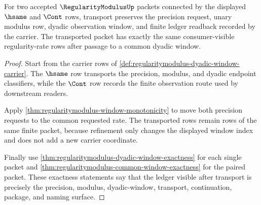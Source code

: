 \begin{theorem}
\label{thm:regularitymodulus-transport-ledger-obligations}
For two accepted $\RegularityModulusUp$ packets connected by the displayed
$\hsame$ and $\Cont$ rows, transport preserves the precision request, unary
modulus row, dyadic observation window, and finite ledger readback recorded by
the carrier. The transported packet has exactly the same consumer-visible
regularity-rate rows after passage to a common dyadic window.
\end{theorem}
\begin{proof}
Start from the carrier rows of
\autoref{def:regularitymodulus-dyadic-window-carrier}. The $\hsame$ row
transports the precision, modulus, and dyadic endpoint classifiers, while the
$\Cont$ row records the finite observation route used by downstream readers.

Apply \autoref{thm:regularitymodulus-window-monotonicity} to move both
precision requests to the common requested rate. The transported rows remain
rows of the same finite packet, because refinement only changes the displayed
window index and does not add a new carrier coordinate.

Finally use \autoref{thm:regularitymodulus-dyadic-window-exactness} for each
single packet and \autoref{thm:regularitymodulus-common-window-exactness} for
the paired packet. These exactness statements say that the ledger visible
after transport is precisely the precision, modulus, dyadic-window,
transport, continuation, package, and naming surface.
\end{proof}

